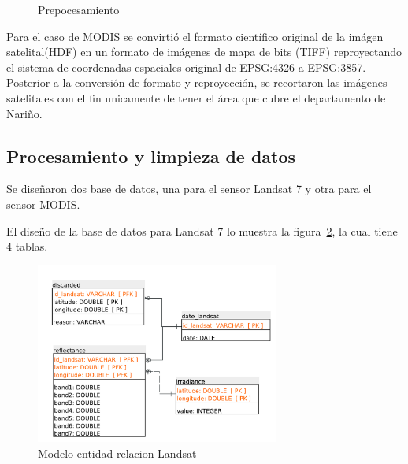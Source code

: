 \begin{figure}
  \centering
  \vfill
  \caption{Prepocesamiento}
  \label{fig:Recortar imágenes}
\end{figure}

Para el caso de MODIS se convirtió el formato científico original de la imágen satelital(HDF) en un formato de imágenes
de mapa de bits (TIFF)
reproyectando el sistema de coordenadas espaciales original 
de  EPSG:4326 a EPSG:3857. Posterior a la conversión de formato y reproyección, 
se recortaron las imágenes satelitales con el fin unicamente de tener el área que cubre el departamento de Nariño.


\subsection{Procesamiento y limpieza de datos}

Se diseñaron dos base de datos, una para el sensor Landsat 7 y otra para el sensor MODIS.

El diseño de la base de datos para Landsat 7 lo muestra la figura~\ref{fig:landsatET}, la cual tiene 4 tablas. 

\begin{figure}
  \centering
  \includegraphics[width = 8cm]{landsatET.pdf}
  \caption{Modelo entidad-relacion Landsat}
  \label{fig:landsatET}
\end{figure}

